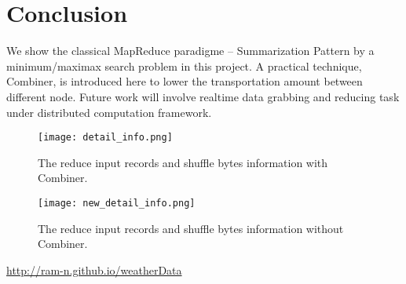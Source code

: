 \documentclass[10pt,twocolumn,letterpaper]{article}
\begin{document}
    \section{Conclusion}
    We show the classical MapReduce paradigme -- Summarization Pattern by a
    minimum/maximax search problem in this project. A practical technique, 
    Combiner, is introduced here to lower the transportation amount between 
    different node. Future work will involve realtime data grabbing and reducing task
    under distributed computation framework.
    \begin{figure}[t]
        \begin{center}
           \texttt{[image: detail\_info.png]}
        \end{center}
           \caption{The reduce input records and shuffle bytes information with Combiner.}
        \label{fig:long}
        \label{fig:onecol}
        \label{with_combiner}
    \end{figure}    
    \begin{figure}[t]
        \begin{center}
           \texttt{[image: new\_detail\_info.png]}
        \end{center}
           \caption{The reduce input records and shuffle bytes information without Combiner.}
        \label{fig:long}
        \label{fig:onecol}
        \label{without_combiner}
    \end{figure}    
    
    {\small
    
    
    }
    \begin{thebibliography}{1}

    \url{http://ram-n.github.io/weatherData}
    \end{thebibliography}

    
\end{document}
